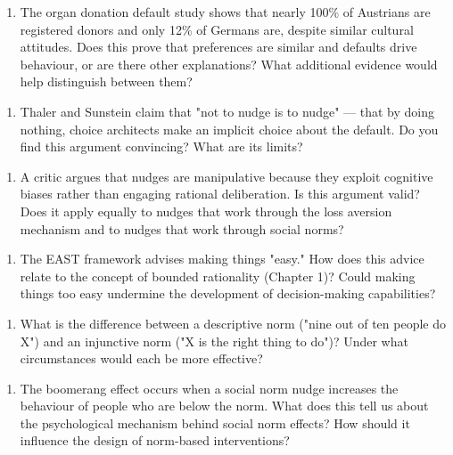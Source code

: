 \documentclass[12pt, letterpaper]{article}
\begin{document}
\begin{enumerate}
\item The organ donation default study shows that nearly 100\% of Austrians are registered donors and only 12\% of Germans are, despite similar cultural attitudes. Does this prove that preferences are similar and defaults drive behaviour, or are there other explanations? What additional evidence would help distinguish between them?
\end{enumerate}

\begin{enumerate}
\item Thaler and Sunstein claim that "not to nudge is to nudge" --- that by doing nothing, choice architects make an implicit choice about the default. Do you find this argument convincing? What are its limits?
\end{enumerate}

\begin{enumerate}
\item A critic argues that nudges are manipulative because they exploit cognitive biases rather than engaging rational deliberation. Is this argument valid? Does it apply equally to nudges that work through the loss aversion mechanism and to nudges that work through social norms?
\end{enumerate}

\begin{enumerate}
\item The EAST framework advises making things "easy." How does this advice relate to the concept of bounded rationality (Chapter 1)? Could making things too easy undermine the development of decision-making capabilities?
\end{enumerate}

\begin{enumerate}
\item What is the difference between a descriptive norm ("nine out of ten people do X") and an injunctive norm ("X is the right thing to do")? Under what circumstances would each be more effective?
\end{enumerate}

\begin{enumerate}
\item The boomerang effect occurs when a social norm nudge increases the behaviour of people who are below the norm. What does this tell us about the psychological mechanism behind social norm effects? How should it influence the design of norm-based interventions?
\end{enumerate}
\end{document}
